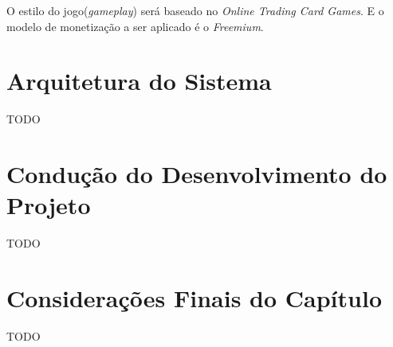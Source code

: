 O estilo do jogo(\textit{gameplay}) será baseado no \textit{Online Trading Card Games}.
E o modelo de monetização a ser aplicado é o \textit{Freemium}.


\section{Arquitetura do Sistema}
TODO

\section{Condução do Desenvolvimento do Projeto}
TODO

\section{Considerações Finais do Capítulo}

TODO
